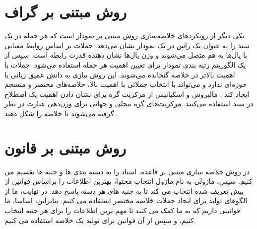 \section{روش مبتنی بر گراف}
یکی دیگر از رویکردهای خلاصه‌سازی روش مبتنی بر نمودار است که هر جمله در یک سند را به عنوان یک راس در یک نمودار نشان می‌دهد. جملات بر اساس روابط معنایی با یال‌ها به هم متصل می‌شوند و وزن یال‌ها نشان دهنده قدرت رابطه است. سپس از یک الگوریتم رتبه بندی نمودار برای تعیین اهمیت هر جمله استفاده می‌شود. جملات با اهمیت بالاتر در خلاصه گنجانده می‌شوند. این روش نیازی به دانش عمیق زبانی یا حوزه‌ای ندارد و می‌تواند با انتخاب جملاتی با اهمیت بالا، خلاصه‌های مختصر و منسجم ‌ایجاد کند
\cite{andhale2016overview}.
مالیروس و اسکیانیس  از مرکزیت گره برای نشان دادن اهمیت یک اصطلاح در سند استفاده می‌کنند. مرکزیت‌های گره محلی و جهانی برای وزن‌دهی عبارت در نظر گرفته می‌شوند تا خلاصه را شکل دهند
\cite{GraphBased}.
\section{روش مبتنی بر قانون }
در روش خلاصه سازی مبتنی بر قاعده، اسناد را به دسته بندی ها و جنبه ها تقسیم می کنیم. سپس، ماژولی به نام ماژول انتخاب محتوا، بهترین اطلاعات را براساس قوانین از پیش تعریف شده انتخاب می کند تا به جنبه های هر دسته پاسخ دهد. در نهایت، ما از الگوهای تولید برای ایجاد جملات خلاصه مختصر استفاده می کنیم. بنابراین، اساسا، ما قوانینی داریم که به ما کمک می کنند تا مهم ترین اطلاعات را برای هر جنبه انتخاب کنیم، و سپس از آن قوانین برای تولید یک خلاصه استفاده می کنیم\cite{Moratanchsurvey}.





